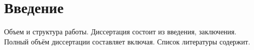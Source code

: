 \documentclass[a4paper, 12pt, oneside, openany]{memoir}
\begin{document}
  
    \chapter{Введение}
    Объем и структура работы. Диссертация состоит из введения,
    заключения. Полный объём диссертации составляет включая. 
    Список литературы содержит.
    

    
    

    


\end{document}
